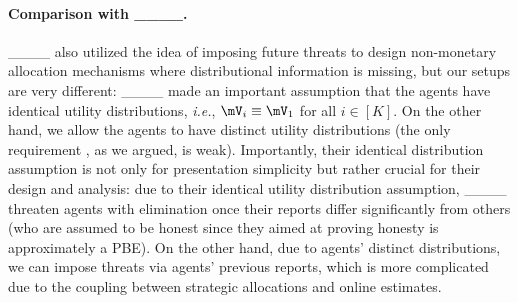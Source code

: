 \paragraph{Comparison with ____.}
____ also utilized the idea of imposing future threats to design non-monetary allocation mechanisms where distributional information is missing, but our setups are very different:
____ made an important assumption that the agents have identical utility distributions, \textit{i.e.}, $\mV_i\equiv \mV_1$ for all $i\in [K]$. On the other hand, we allow the agents to have distinct utility distributions (the only requirement , as we argued, is weak). 
Importantly, their identical distribution assumption is not only for presentation simplicity but rather crucial for their design and analysis: due to their identical utility distribution assumption, ____ threaten agents with elimination once their reports differ significantly from others (who are assumed to be honest since they aimed at proving honesty is approximately a PBE). On the other hand, due to agents' distinct distributions, we can impose threats via agents' previous reports, which is more complicated due to the coupling between strategic allocations and online estimates.